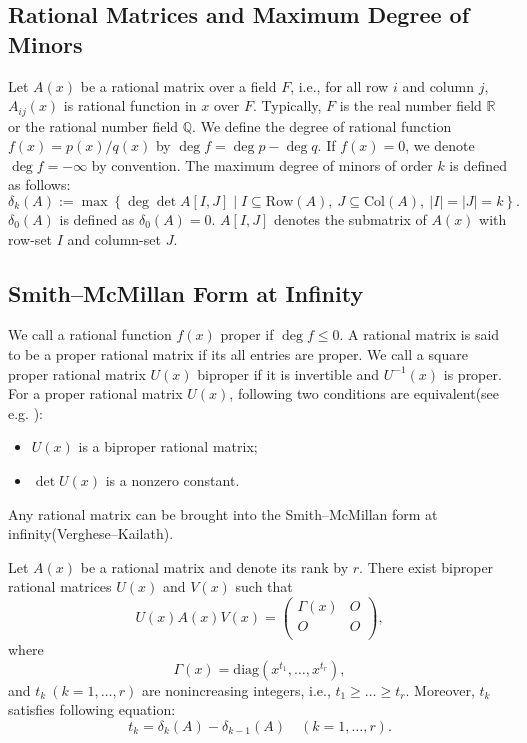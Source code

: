 \subsection{Rational Matrices and Maximum Degree of Minors}
\label{rfm}
Let $ A (x) $ be a rational matrix over a field $F$, 
i.e., for all row $ i $ and column $j$, $ A_{ij} (x) $ is rational function in $x$ over $F$.
Typically, $ F $ is the real number field $ \mathbb{R} $ or 
the rational number field $\mathbb{Q}$.
We define the degree of rational function $ f (x) = p(x) / q(x)$ by $ \deg f = \deg p - \deg q $.
If $ f(x) = 0 $, we denote $ \deg f = - \infty $ by convention. 
The maximum degree of minors of order $k$ is defined as follows:
\begin{equation}
\delta_k (A) := \max \left\{ \deg  \det A[I,J] \mid I \subseteq \mathrm{Row} (A), \ J \subseteq \mathrm{Col} (A), \  |I| = |J| = k \right\}.
\end{equation}
$\delta_0 (A) $ is defined as $ \delta_0 (A) = 0 $. 
$ A[I,J] $ denotes the submatrix of $A(x) $ with row-set $I$ and column-set $J$.

\subsection{Smith--McMillan Form at Infinity}
\label{smf}
We call a rational function $ f(x) $ proper if $ \deg f \le 0 $. 
A rational matrix is said to be a proper rational matrix if its all entries are proper. 
We call a square proper rational matrix $U(x)$ biproper 
if it is invertible and $ U^{-1} (x) $ is proper.
For a proper rational matrix $ U(x) $, 
following two conditions are equivalent(see e.g. \cite{MMSA}):
\begin{itemize}
\item $U(x)$ is a biproper rational matrix;
\item $ \det U (x) $ is a nonzero constant.
\end{itemize}

Any rational matrix can be brought into the Smith--McMillan form at infinity(Verghese--Kailath\cite{RMS}).
\begin{proposition}
Let $ A(x) $ be a rational matrix and denote its rank by $r$. 
There exist biproper rational matrices $U(x) $ and $ V(x) $ such that 
\[ U(x) A(x) V(x) = \begin{pmatrix} \Gamma (x) & O \\ O & O \\ \end{pmatrix}, \]
where 
\[ \Gamma (x) = \mathrm{diag} ( x^{t_1},\dots, x^{t_r}), \]
and $ t_k \ ( k = 1, \dots ,r) $ are nonincreasing integers, 
i.e., $ t_1 \ge \dots \ge t_r $.
Moreover, $ t_k $ satisfies following equation:
\[ t_k = \delta_k (A) - \delta_{k-1} (A) \quad ( k = 1 ,\dots ,r). \]
\end{proposition}

